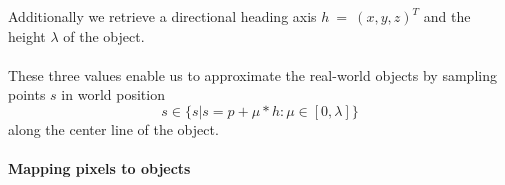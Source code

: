 Additionally we retrieve a directional heading axis $h~=~(x, y, z)^T$ and the height $\lambda$ of the object.
\\
\\
These three values enable us to approximate the real-world objects by sampling points $s$ in world position
 \begin{equation}
  s \in \{s | s = p + \mu * h : \mu \in [0, \lambda]\}  
\end{equation}
along the center line of the object. 

\paragraph{Mapping pixels to objects}








